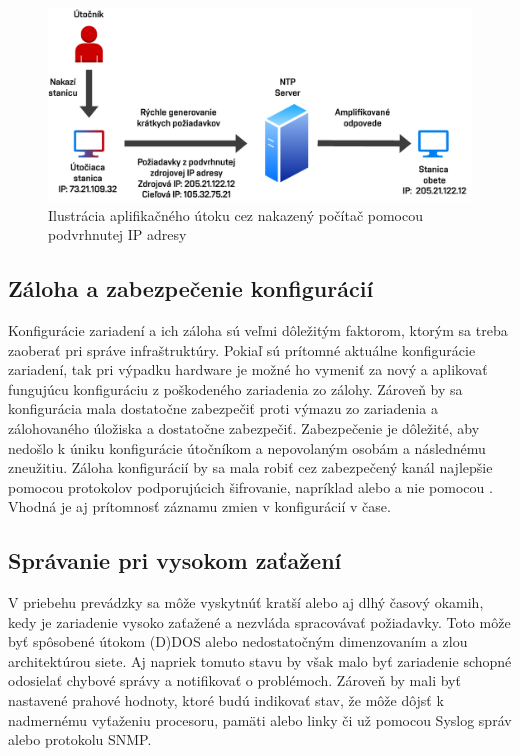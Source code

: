 \begin{figure}[H]
	\begin{center}
		\includegraphics[scale=0.75]{obrazky/ntp_amplification.pdf}
	\end{center}
	\caption[Ilustrácia aplifikačného útoku cez nakazený počítač pomocou podvrhnutej IP adresy]{Ilustrácia aplifikačného útoku cez nakazený počítač pomocou podvrhnutej IP adresy \cite{gTkmbyKon9H6tuAm}}
	\label{fig:ntp-amp}
\end{figure} 

\subsection*{Záloha a zabezpečenie konfigurácií}
Konfigurácie zariadení a ich záloha sú veľmi dôležitým faktorom, ktorým sa treba zaoberať pri správe infraštruktúry. Pokiaľ sú prítomné aktuálne konfigurácie zariadení, tak pri výpadku hardware je možné ho vymeniť za nový a aplikovať fungujúcu konfiguráciu z poškodeného zariadenia zo zálohy. Zároveň by sa konfigurácia mala dostatočne zabezpečiť proti výmazu zo zariadenia a zálohovaného úložiska a dostatočne zabezpečiť. Zabezpečenie je dôležité, aby nedošlo k úniku konfigurácie útočníkom a nepovolaným osobám a následnému zneužitiu. Záloha konfigurácií by sa mala robiť cez zabezpečený kanál najlepšie pomocou protokolov podporujúcich šifrovanie, napríklad  alebo  a nie pomocou . Vhodná je aj prítomnosť záznamu zmien v konfigurácií v čase.

\subsection*{Správanie pri vysokom zaťažení}
V priebehu prevádzky sa môže vyskytnúť kratší alebo aj dlhý časový okamih, kedy je zariadenie vysoko zaťažené a nezvláda spracovávať požiadavky. Toto môže byť spôsobené útokom (D)DOS alebo nedostatočným dimenzovaním a zlou architektúrou siete. Aj napriek tomuto stavu by však malo byť zariadenie schopné odosielať chybové správy a notifikovať o problémoch. Zároveň by mali byť nastavené prahové hodnoty, ktoré budú indikovať stav, že môže dôjsť k nadmernému vyťaženiu procesoru, pamäti alebo linky či už pomocou Syslog správ alebo protokolu SNMP.

